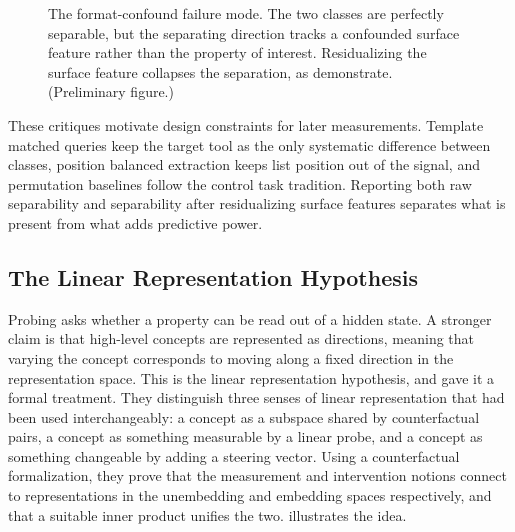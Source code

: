 \begin{figure}[htbp]
\centering
{}
\caption{The format-confound failure mode. The two classes are perfectly separable, but the separating direction tracks a confounded surface feature rather than the property of interest. Residualizing the surface feature collapses the separation, as \textcite{sahoo2026linear} demonstrate. (Preliminary figure.)}
\label{fig:confound}
\end{figure}


These critiques motivate design constraints for later measurements.
Template matched queries keep the target tool as the only systematic difference between classes, position balanced extraction keeps list position out of the signal, and permutation baselines follow the control task tradition.
Reporting both raw separability and separability after residualizing surface features separates what is present from what adds predictive power.

\subsection{The Linear Representation Hypothesis}
\label{sec:linearrep}

Probing asks whether a property can be read out of a hidden state.
A stronger claim is that high-level concepts are represented as directions, meaning that varying the concept corresponds to moving along a fixed direction in the representation space.
This is the linear representation hypothesis, and \textcite{park2024linear} gave it a formal treatment.
They distinguish three senses of linear representation that had been used interchangeably: a concept as a subspace shared by counterfactual pairs, a concept as something measurable by a linear probe, and a concept as something changeable by adding a steering vector.
Using a counterfactual formalization, they prove that the measurement and intervention notions connect to representations in the unembedding and embedding spaces respectively, and that a suitable inner product unifies the two.
 illustrates the idea.

